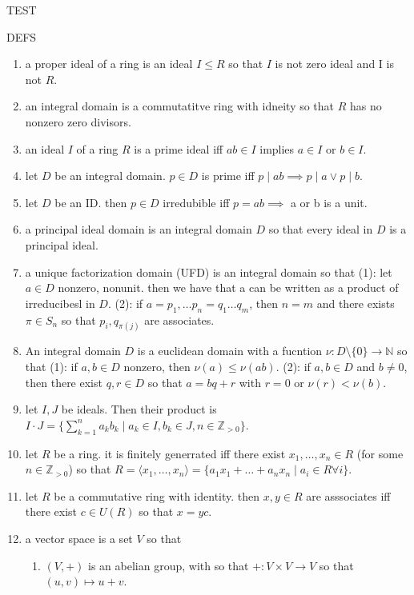 

\begin{center}
	TEST
\end{center}
DEFS
\begin{enumerate}
	\item a proper ideal of a ring is an ideal $I \leq R$ so that $I$ is not zero ideal and I is not $R$. 
	\item an integral domain is a commutatitve ring with idneity so that $R$ has no nonzero zero divisors. 
	\item an ideal $I$ of a ring $R$ is a prime ideal iff $ab \in I$ implies $a \in I$ or $b \in I$. 
	\item let $D$ be an integral domain. $p \in D$ is prime iff $p \mid ab \implies p \mid a \lor p \mid b$. 
	\item let $D$ be an ID. then $p \in D$ irredubible iff $p = ab \implies$ a or b is a unit. 
	\item a principal ideal domain is an integral domain $D$ so that every ideal in $D$ is a principal ideal. 	
	\item a unique factorization domain (UFD) is an integral domain so that (1): let $a \in D$ nonzero, nonunit. then we have that a can be written as a product of irreducibesl in $D$. (2): if $a=p_1,\dots p_n = q_1 \dots q_m$, then $n=m$ and there exists $\pi \in S_n$ so that $p_i, q_{\pi(j)}$ are associates. 
	\item An integral domain $D$ is a euclidean domain with a fucntion $\nu: D \setminus \{0\} \to \mathbb{N}$ so that (1): if $a,b \in D$ nonzero, then $\nu(a) \leq \nu(ab)$. (2): if $a,b \in D$ and $b \neq 0$, then there exist $q,r \in D$ so that $a=bq+r$ with $r = 0$ or $\nu(r) < \nu(b)$. 
	\item let $I,J$ be ideals. Then their product is $I \cdot J = \{\sum_{k=1}^n a_kb_k \mid a_k \in I, b_k \in J, n \in \mathbb{Z}_{>0}\}$. 
	\item let $R$ be a ring. it is finitely generrated iff there exist $x_1,\dots,x_n \in R$ (for some $n \in \mathbb{Z}_{>0}$) so that $R = \langle x_1,\dots,x_n \rangle = \{a_1x_1 + \dots + a_nx_n \mid a_i \in R \forall i\}$. 
	\item let $R$ be a commutative ring with identity. then $x,y \in R$ are asssociates iff there exist $c \in U(R)$ so that $x=yc$. 
	\item a vector space is a set $V$ so that 
	\begin{enumerate}
		\item $(V,+)$ is an abelian group, with so that $+: V \times V \to V$ so that $(u,v) \mapsto u+v$. 

\end{enumerate}
\end{enumerate}
